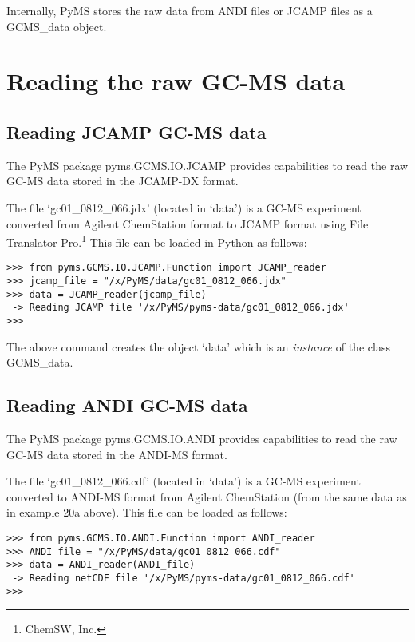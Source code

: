 Internally, PyMS stores the raw data from ANDI files or JCAMP files as a
GCMS\_data object.

\section{Reading the raw GC-MS data}

\subsection{Reading JCAMP GC-MS data}


The PyMS package pyms.GCMS.IO.JCAMP provides capabilities to read the raw
GC-MS data stored in the JCAMP-DX format.

The file `gc01\_0812\_066.jdx' (located in `data') is a GC-MS experiment
converted from Agilent ChemStation format to JCAMP format using File
Translator Pro.\footnote{ChemSW, Inc.} This file can be loaded in Python
as follows:

\begin{verbatim}
>>> from pyms.GCMS.IO.JCAMP.Function import JCAMP_reader
>>> jcamp_file = "/x/PyMS/data/gc01_0812_066.jdx"
>>> data = JCAMP_reader(jcamp_file)
 -> Reading JCAMP file '/x/PyMS/pyms-data/gc01_0812_066.jdx'
>>>
\end{verbatim}

\noindent
The above command creates the object `data' which is an {\em instance}
of the class GCMS\_data.

\subsection{Reading ANDI GC-MS data}


The PyMS package pyms.GCMS.IO.ANDI provides capabilities to read the raw
GC-MS data stored in the ANDI-MS format.

The file `gc01\_0812\_066.cdf' (located in `data') is a GC-MS experiment
converted to ANDI-MS format from Agilent ChemStation (from the same data as in
example 20a above). This file can be loaded as follows:

\begin{verbatim}
>>> from pyms.GCMS.IO.ANDI.Function import ANDI_reader
>>> ANDI_file = "/x/PyMS/data/gc01_0812_066.cdf"
>>> data = ANDI_reader(ANDI_file)
 -> Reading netCDF file '/x/PyMS/pyms-data/gc01_0812_066.cdf'
>>>
\end{verbatim}

